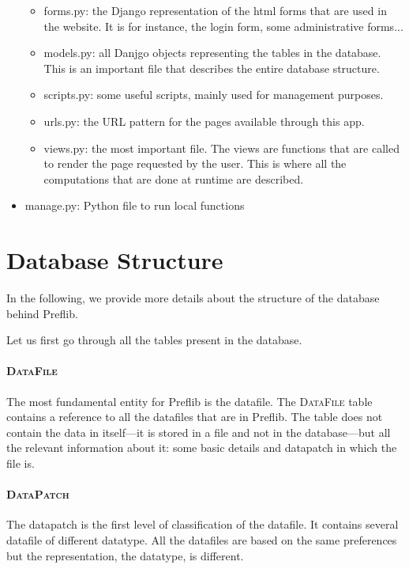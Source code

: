 \documentclass{report}
\begin{document}
\begin{itemize}
\begin{itemize}
			\item forms.py: the Django representation of the html forms that are used in the website. It is for instance, the login form, some administrative forms...
			\item models.py: all Danjgo objects representing the tables in the database. This is an important file that describes the entire database structure.
			\item scripts.py: some useful scripts, mainly used for management purposes.
			\item urls.py: the URL pattern for the pages available through this app.
			\item views.py: the most important file. The views are functions that are called to render the page requested by the user. This is where all the computations that are done at runtime are described.
		\end{itemize}
		\item manage.py: Python file to run local functions
	\end{itemize}
	
	\section{Database Structure}
	
	In the following, we provide more details about the structure of the database behind Preflib.
	
	\medskip
	
	Let us first go through all the tables present in the database.
	
	\paragraph{\textsc{DataFile}} The most fundamental entity for Preflib is the datafile. The \textsc{DataFile} table contains a reference to all the datafiles that are in Preflib. The table does not contain the data in itself---it is stored in a file and not in the database---but all the relevant information about it: some basic details and datapatch in which the file is.
	
	\paragraph{\textsc{DataPatch}} The datapatch is the first level of classification of the datafile. It contains several datafile of different datatype. All the datafiles are based on the same preferences but the representation, the datatype, is different.
	
\end{document}
